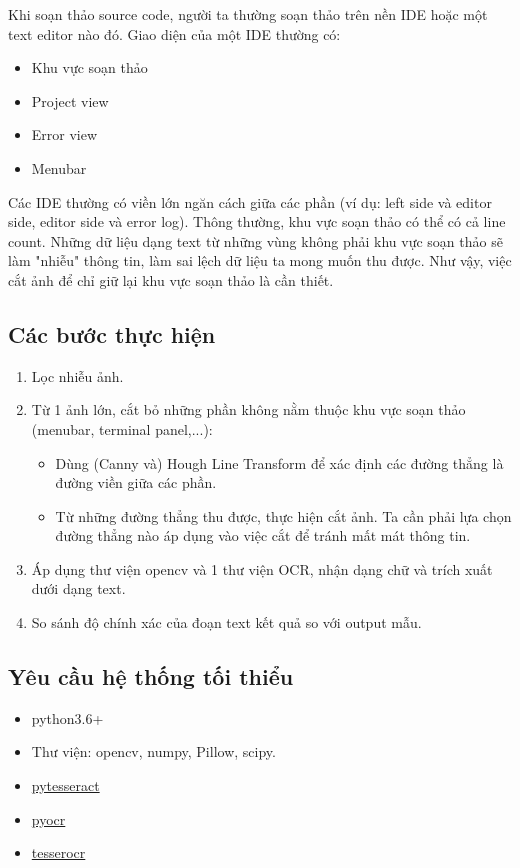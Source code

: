 \documentclass[12pt,a4paper]{article}
\begin{document}
Khi soạn thảo source code, người ta thường soạn thảo trên nền IDE hoặc một text editor nào đó. Giao diện của một IDE thường có:

\begin{itemize}
	\item Khu vực soạn thảo
	\item Project view
	\item Error view
	\item Menubar
\end{itemize}

Các IDE thường có viền lớn ngăn cách giữa các phần (ví dụ: left side và editor side, editor side và error log). Thông thường, khu vực soạn thảo có thể có cả line count. Những dữ liệu dạng text từ những vùng không phải khu vực soạn thảo sẽ làm "nhiễu" thông tin, làm sai lệch dữ liệu ta mong muốn thu được. Như vậy, việc cắt ảnh để chỉ giữ lại khu vực soạn thảo là cần thiết.

\subsection{Các bước thực hiện}

\begin{enumerate}
	\item Lọc nhiễu ảnh.

	\item Từ 1 ảnh lớn, cắt bỏ những phần không nằm thuộc khu vực soạn thảo (menubar, terminal panel,...):\begin{itemize}
		\item Dùng (Canny và) Hough Line Transform để xác định các đường thẳng là đường viền giữa các phần.
		\item Từ những đường thẳng thu được, thực hiện cắt ảnh. Ta cần phải lựa chọn đường thẳng nào áp dụng vào việc cắt để tránh mất mát thông tin.
	\end{itemize}
	\item Áp dụng thư viện opencv và 1 thư viện OCR, nhận dạng chữ và trích xuất dưới dạng text.

	\item So sánh độ chính xác của đoạn text kết quả so với output mẫu.
\end{enumerate}

\subsection{Yêu cầu hệ thống tối thiểu}

\begin{itemize}
	\item python3.6+
	\item Thư viện: opencv, numpy, Pillow, scipy.
	\item \href{https://github.com/madmaze/pytesseract}{pytesseract}
	\item \href{https://gitlab.gnome.org/World/OpenPaperwork/pyocr}{pyocr}
	\item \href{https://github.com/sirfz/tesserocr}{tesserocr}
\end{itemize}
\end{document}
